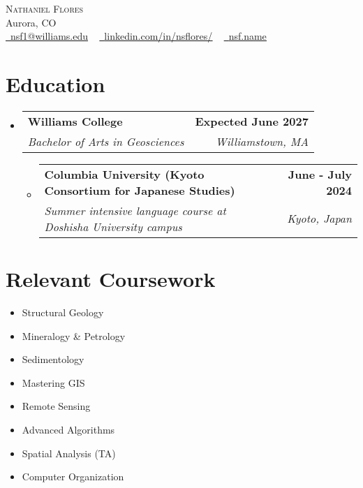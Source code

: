\documentclass[letterpaper, 11pt]{article}
\makeatletter
\newcommand{\resumeItem}[1]{ \item\small{ {#1 \vspace{-2pt}} } }
\newcommand{\resumeSubheading}[4]{
\vspace{-2pt}
\item
\begin{tabular*}{1.0\textwidth}[t]{l@{\extracolsep{\fill}}r}
	\textbf{#1}       & \textbf{\small #2} \\
	\textit{\small#3} & \textit{\small #4} \\
\end{tabular*}
\vspace{-8pt}
}
\newcommand{\resumeSubHeadingListStart}{\begin{itemize}[leftmargin=0.0in, label={}]}
\newcommand{\resumeSubHeadingListEnd}{\end{itemize}}
\newcommand{\resumeItemListStart}{\vspace{-6pt}\begin{itemize}}
\newcommand{\resumeItemListEnd}{\end{itemize}
\vspace{-6pt}}
\makeatother
\begin{document}
	\begin{center}
		{\Huge \scshape Nathaniel Flores} \\
		\vspace{1pt}
		Aurora, CO \\
		\vspace{1pt}
		\href{mailto:nsf1@williams.edu}{\raisebox{-0.2\height}{\faEnvelope}\ \underline{nsf1@williams.edu}}
		~
		\href{https://www.linkedin.com/in/nsflores/}{\raisebox{-0.2\height}{\faLinkedin}\ \underline{linkedin.com/in/nsflores/}}
                ~
                \href{https://nsf.name/}{\raisebox{-0.2\height}{\faGlobe}\ \underline{nsf.name}}
		\vspace{-8pt}
	\end{center}

	\section{Education}
	\resumeSubHeadingListStart \resumeSubheading {Williams College}{Expected June 2027}
	{Bachelor of Arts in Geosciences}{Williamstown, MA}
        \resumeSubHeadingListStart \resumeSubheading {Columbia University (Kyoto Consortium for Japanese Studies)}{June - July 2024}
	{Summer intensive language course at Doshisha University campus}{Kyoto, Japan}
	\resumeItemListEnd \resumeSubHeadingListEnd

	\section{Relevant Coursework}
	\begin{multicols}{4}
          {\small \begin{itemize}[itemsep=-5pt, parsep=3pt]
                \item Structural Geology

		\item Mineralogy \& Petrology

                \item Sedimentology

		\item Mastering GIS

		\item Remote Sensing

		\item Advanced Algorithms

		\item Spatial Analysis (TA)

		\item Computer Organization
            \end{itemize} }
	\end{multicols}
	\vspace*{2.0\multicolsep}
\end{document}
